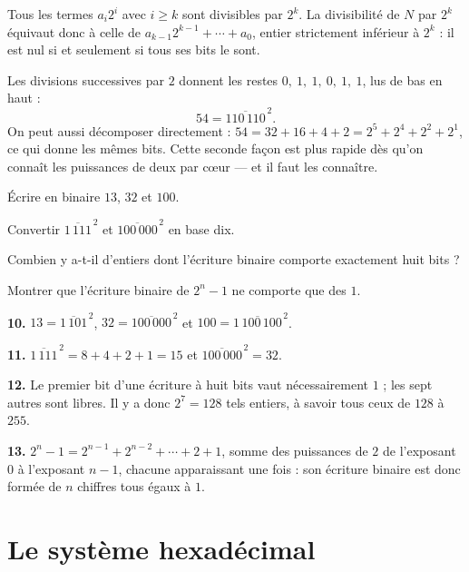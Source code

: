 \begin{demonstration}
Tous les termes $a_{i}2^{i}$ avec $i \geq k$ sont divisibles par $2^{k}$. La
divisibilité de $N$ par $2^{k}$ équivaut donc à celle de
$a_{k-1}2^{k-1}+\cdots+a_{0}$, entier strictement inférieur à $2^{k}$ : il est
nul si et seulement si tous ses bits le sont.
\end{demonstration}

\begin{exemple}
Les divisions successives par $2$ donnent les restes
$0,\ 1,\ 1,\ 0,\ 1,\ 1$, lus de bas en haut :
\[
  54 = \overline{110\,110}^{\,2}.
\]
On peut aussi décomposer directement : $54 = 32+16+4+2 = 2^{5}+2^{4}+2^{2}
+2^{1}$, ce qui donne les mêmes bits. Cette seconde façon est plus rapide dès
qu'on connaît les puissances de deux par cœur — et il faut les connaître.
\end{exemple}

\begin{entrainement}[binaire]
\exo[\niveau{1}] Écrire en binaire $13$, $32$ et $100$.

\exo[\niveau{1}] Convertir $\overline{1\,111}^{\,2}$ et
$\overline{100\,000}^{\,2}$ en base dix.

\exo[\niveau{2}] Combien y a-t-il d'entiers dont l'écriture binaire comporte
exactement huit bits ?

\exo[\niveau{3}] Montrer que l'écriture binaire de $2^{n}-1$ ne comporte que
des $1$.
\end{entrainement}

\begin{corrige}
\textbf{10.} $13 = \overline{1\,101}^{\,2}$, $32 = \overline{100\,000}^{\,2}$
et $100 = \overline{1\,100\,100}^{\,2}$.

\textbf{11.} $\overline{1\,111}^{\,2} = 8+4+2+1 = 15$ et
$\overline{100\,000}^{\,2} = 32$.

\textbf{12.} Le premier bit d'une écriture à huit bits vaut nécessairement
$1$ ; les sept autres sont libres. Il y a donc $2^{7} = 128$ tels entiers, à
savoir tous ceux de $128$ à $255$.

\textbf{13.} $2^{n}-1 = 2^{n-1}+2^{n-2}+\cdots+2+1$, somme des puissances de
$2$ de l'exposant $0$ à l'exposant $n-1$, chacune apparaissant une fois : son
écriture binaire est donc formée de $n$ chiffres tous égaux à $1$.
\end{corrige}

\section{Le système hexadécimal}

